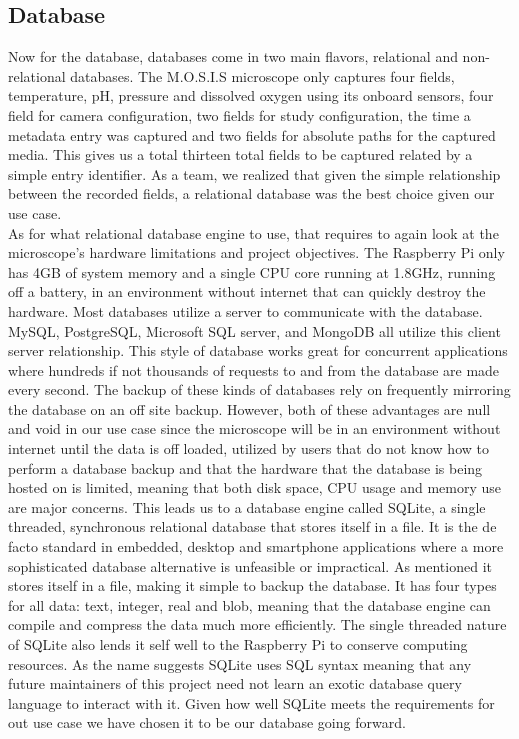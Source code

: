 \subsection{Database}
Now for the database, databases come in two main flavors, relational and non-relational databases. The M.O.S.I.S microscope only captures four fields, temperature, pH, pressure and dissolved oxygen using its onboard sensors, four field for camera configuration, two fields for study configuration, the time a metadata entry was captured and two fields for absolute paths for the captured media. This gives us a total thirteen total fields to be captured related by a simple entry identifier. As a team, we realized that given the simple relationship  between the recorded fields, a relational database was the best choice given our use case.\\
As for what relational database engine to use, that requires to again look at the microscope's hardware limitations and project objectives. The Raspberry Pi only has 4GB of system memory and a single CPU core running at 1.8GHz, running off a battery, in an environment without internet that can quickly destroy the hardware. Most databases utilize a server to communicate with the database. MySQL, PostgreSQL, Microsoft SQL server, and MongoDB all utilize this client server relationship. This style of database works great for concurrent applications where hundreds if not thousands of requests to and from the database are made every second. The backup of these kinds of databases rely on frequently mirroring the database on an off site backup. However, both of these advantages are null and void in our use case since the microscope will be in an environment without internet until the data is off loaded, utilized by users that do not know how to perform a database backup and that the hardware that the database is being hosted on is limited, meaning that both disk space, CPU usage and memory use are major concerns. This leads us to a database engine called SQLite, a single threaded, synchronous relational database that stores itself in a file. It is the de facto standard in embedded, desktop and smartphone applications where a more sophisticated database alternative is unfeasible or impractical. As mentioned it stores itself in a file, making it simple to backup the database. It has four types for all data: text, integer, real and blob, meaning that the database engine can compile and compress the data much more efficiently. The single threaded nature of SQLite also lends it self well to the Raspberry Pi to conserve computing resources. As the name suggests SQLite uses SQL syntax meaning that any future maintainers of this project need not learn an exotic database query language to interact with it. Given how well SQLite meets the requirements for out use case we have chosen it to be our database going forward.